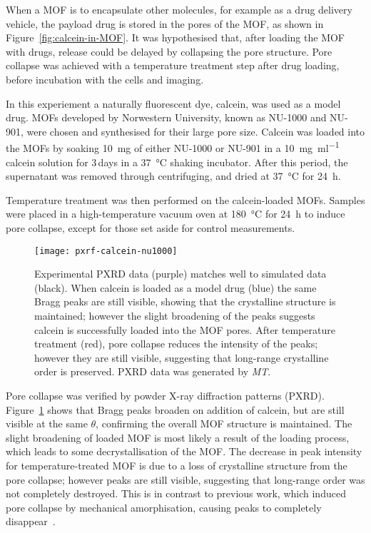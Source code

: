 When a MOF is to encapsulate other molecules, for example as a drug delivery vehicle, the payload drug is stored in the pores of the MOF, as shown in Figure~\ref{fig:calcein-in-MOF}. 
It was hypothesised that, after loading the MOF with drugs, release could be delayed by collapsing the pore structure. 
Pore collapse was achieved with a temperature treatment step after drug loading, before incubation with the cells and imaging. 

In this experiement a naturally fluorescent dye, calcein, was used as a model drug. 
MOFs developed by Norwestern University, known as NU-1000 and NU-901, were chosen and synthesised for their large pore size. 
Calcein was loaded into the MOFs by soaking \SI{10}{\milli\gram} of either NU-1000 or NU-901 in a \SI[per-mode=symbol]{10}{\milli\gram\per\milli\litre} calcein solution for 3\,days in a \SI{37}{\degreeCelsius} shaking incubator. 
After this period, the supernatant was removed through centrifuging, and dried at \SI{37}{\degreeCelsius} for \SI{24}{\hour}. 

Temperature treatment was then performed on the calcein-loaded MOFs. 
Samples were placed in a high-temperature vacuum oven at \SI{180}{\degreeCelsius} for \SI{24}{\hour} to induce pore collapse, except for those set aside for control measurements.  

\begin{figure}[b!]
\centering
\texttt{[image: pxrf-calcein-nu1000]}
\caption[MOFs: PXRD confirms calcein enters NU-1000 and temperature treatment causes partial pore collapse]{ Experimental PXRD data (purple) matches well to simulated data (black). When calcein is loaded as a model drug (blue) the same Bragg peaks are still visible, showing that the crystalline structure is maintained; however the slight broadening of the peaks suggests calcein is successfully loaded into the MOF pores. After temperature treatment (red), pore collapse reduces the intensity of the peaks; however they are still visible, suggesting that long-range crystalline order is preserved. PXRD data was generated by \textit{MT}. }
\label{fig:MOF-PXRF}
\end{figure}

Pore collapse was verified by powder X-ray diffraction patterns (PXRD). 
Figure~\ref{fig:MOF-PXRF} shows that Bragg peaks broaden on addition of calcein, but are still visible at the same $\theta$, confirming the overall MOF structure is maintained. 
The slight broadening of loaded MOF is most likely a result of the loading process, which leads to some decrystallisation of the MOF. 
The decrease in peak intensity for temperature-treated MOF is due to a loss of crystalline structure from the pore collapse; however peaks are still visible, suggesting that long-range order was not completely destroyed.
This is in contrast to previous work, which induced pore collapse by mechanical amorphisation, causing peaks to completely disappear~\cite{orellana2015amorphous}.

